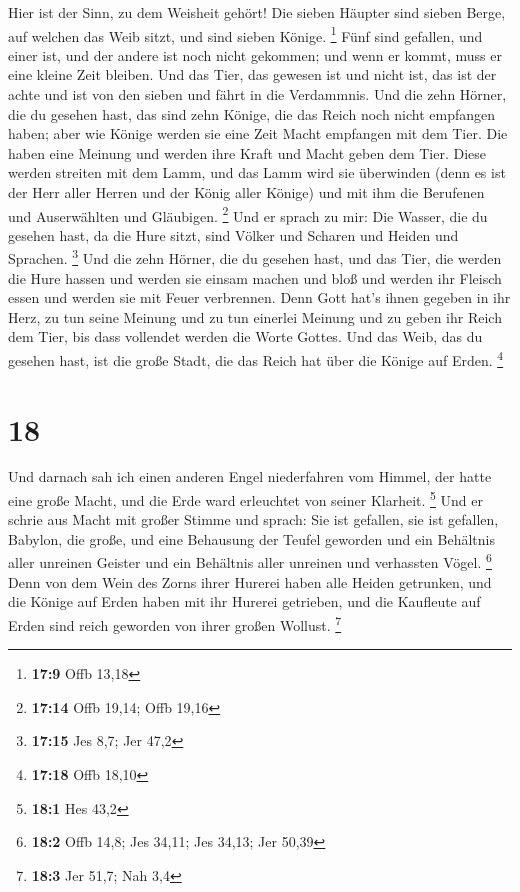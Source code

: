  Hier ist der Sinn, zu dem Weisheit gehört! Die sieben
Häupter sind sieben Berge, auf welchen das Weib sitzt, und sind sieben
Könige. \footnote{\textbf{17:9} Offb 13,18}  Fünf sind
gefallen, und einer ist, und der andere ist noch nicht gekommen; und
wenn er kommt, muss er eine kleine Zeit bleiben.  Und das
Tier, das gewesen ist und nicht ist, das ist der achte und ist von den
sieben und fährt in die Verdammnis.  Und die zehn Hörner,
die du gesehen hast, das sind zehn Könige, die das Reich noch nicht
empfangen haben; aber wie Könige werden sie eine Zeit Macht empfangen
mit dem Tier.  Die haben eine Meinung und werden ihre
Kraft und Macht geben dem Tier.  Diese werden streiten
mit dem Lamm, und das Lamm wird sie überwinden (denn es ist der Herr
aller Herren und der König aller Könige) und mit ihm die Berufenen und
Auserwählten und Gläubigen. \footnote{\textbf{17:14} Offb 19,14; Offb
  19,16}  Und er sprach zu mir: Die Wasser, die du
gesehen hast, da die Hure sitzt, sind Völker und Scharen und Heiden und
Sprachen. \footnote{\textbf{17:15} Jes 8,7; Jer 47,2} 
Und die zehn Hörner, die du gesehen hast, und das Tier, die werden die
Hure hassen und werden sie einsam machen und bloß und werden ihr Fleisch
essen und werden sie mit Feuer verbrennen.  Denn Gott
hat's ihnen gegeben in ihr Herz, zu tun seine Meinung und zu tun
einerlei Meinung und zu geben ihr Reich dem Tier, bis dass vollendet
werden die Worte Gottes.  Und das Weib, das du gesehen
hast, ist die große Stadt, die das Reich hat über die Könige auf Erden.
\footnote{\textbf{17:18} Offb 18,10}

\hypertarget{section-7}{%
\section{18}\label{section-7}}

 Und darnach sah ich einen anderen Engel niederfahren vom
Himmel, der hatte eine große Macht, und die Erde ward erleuchtet von
seiner Klarheit. \footnote{\textbf{18:1} Hes 43,2}  Und er
schrie aus Macht mit großer Stimme und sprach: Sie ist gefallen, sie ist
gefallen, Babylon, die große, und eine Behausung der Teufel geworden und
ein Behältnis aller unreinen Geister und ein Behältnis aller unreinen
und verhassten Vögel. \footnote{\textbf{18:2} Offb 14,8; Jes 34,11; Jes
  34,13; Jer 50,39}  Denn von dem Wein des Zorns ihrer
Hurerei haben alle Heiden getrunken, und die Könige auf Erden haben mit
ihr Hurerei getrieben, und die Kaufleute auf Erden sind reich geworden
von ihrer großen Wollust. \footnote{\textbf{18:3} Jer 51,7; Nah 3,4}

